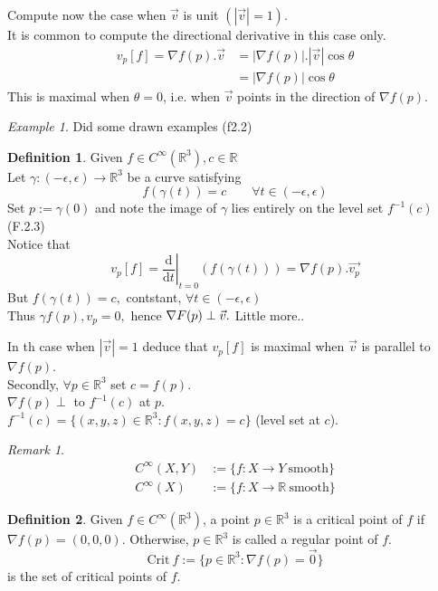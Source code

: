 \documentclass{article}
\renewcommand{\d}{\mathrm{d}}
\newcommand{\R}{\mathbb{R}}
\newcommand{\dv}[2]{\frac{\d #1}{\d #2}}
\theoremstyle{definition}
\newtheorem{definition}{Definition}[section]
\theoremstyle{remark}
\theoremstyle{example}
\newtheorem*{remark}{Remark}
\newtheorem*{example}{Example}
\begin{document}
	Compute now the case when $\vec{v}$ is unit $(|\vec{v}|=1)$.\\
	It is common to compute the directional derivative in this case only.\\
	\begin{align*}
		v_p[f]=\nabla f(p).\vec{v} & = |\nabla f(p)| . |\vec{v}| \cos \theta\\
		& = |\nabla f(p)| \cos \theta
	\end{align*}
	This is maximal when $\theta=0$, i.e. when $\vec{v}$ points in the direction of $\nabla f(p)$.\\
	\begin{example}
		Did some drawn examples (f2.2)
	\end{example}

	\begin{definition}
		Given $f \in C^\infty(\R^3), c \in \R$\\
		Let $\gamma : (-\epsilon,\epsilon) \to \R^3$ be a curve satisfying \[ f(\gamma(t)) = c \qquad \forall t \in (-\epsilon,\epsilon)\]
		Set $p:= \gamma(0)$ and note the image of $\gamma$ lies entirely on the level set $f^{-1}(c)$ (F.2.3)\\
		Notice that \[ v_p[f]=\left.\dv{}{t}\right|_{t=0}(f(\gamma(t)))=\nabla f(p).\vec{v_p} \]
		But $f(\gamma(t))=c,$ contstant, $\forall t \in (-\epsilon,\epsilon)$\\
		Thus $\gamma f(p),v_p=0, $ hence $\nabla F(p) \perp \vec{v}.\\$
		Little more..
	\end{definition}

	In th case when $|\vec{v}|=1$ deduce that $v_p[f]$ is maximal when $\vec{v}$ is parallel to $\nabla f(p)$.\\
	Secondly, $\forall p \in \R^3$ set $c=f(p)$.\\
	$\nabla f(p) \perp$ to $f^{-1}(c)$ at $p$.\\
	$f^{-1}(c)=\{(x,y,z) \in \R^3 : f(x,y,z)=c\}$ (level set at $c$).
	
	\begin{remark}
		\begin{align*}
		 C^\infty(X,Y)& := \{f : X \to Y \ \mathrm{smooth} \}\\
		 C^\infty(X) &:= \{f : X \to \R \  \mathrm{smooth} \}
		\end{align*}
	\end{remark}
	
	\begin{definition}
		Given $f \in C^\infty(\R^3)$, a point $p \in \R^3$ is a critical point of $f$ if $\nabla f(p)=(0,0,0)$.
		Otherwise, $p \in \R^3$ is called a regular point of $f$.\\
		\[\mathrm{Crit}\ f := \{p \in \R^3:\nabla f(p)=\vec{0}\} \]
		is the set of critical points of $f$.
	\end{definition}
\end{document}
